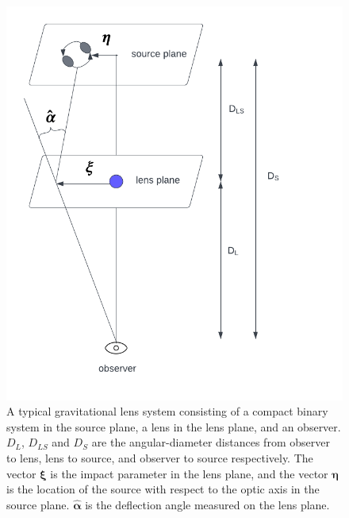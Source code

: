 \documentclass[floats,floatfix,showpacs,amssymb,prd,twocolumn,superscriptaddress,nofootinbib,nolongbibliography,reprint]{revtex4-2}
\begin{document}
\begin{figure}[t!]
    \centering
    \includegraphics[scale = 0.52]{Figures/lens_system.pdf}
    \caption{A typical gravitational lens system consisting of a compact binary system in the source plane, a lens in the lens plane, and an observer.  $D_L$, $D_{LS}$ and $D_S$ are the angular-diameter distances from observer to lens, lens to source, and observer to source respectively. The vector $\boldsymbol{\xi}$ is the impact parameter in the lens plane, and the vector $\boldsymbol{\eta}$ is the location of the source with respect to the optic axis in the source plane.  $\hat{\boldsymbol{\alpha}}$ is the deflection angle measured on the lens plane.}
    \label{fig:lens system}
\end{figure}
\end{document}
